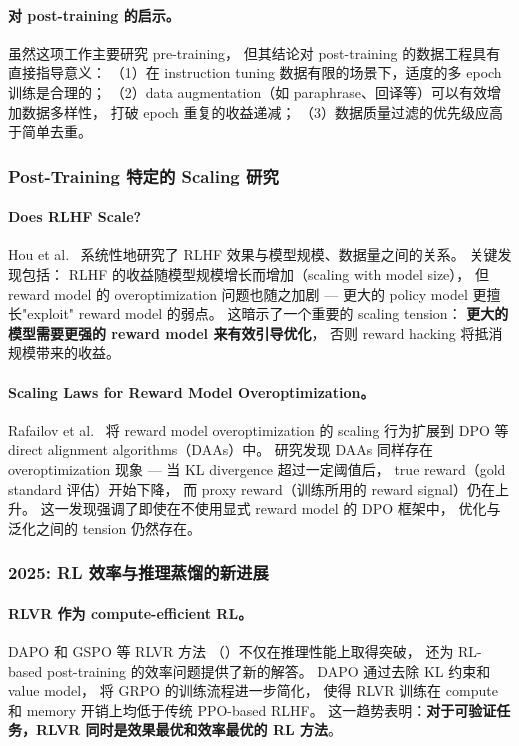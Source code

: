\paragraph{对 post-training 的启示。}
虽然这项工作主要研究 pre-training，
但其结论对 post-training 的数据工程具有直接指导意义：
（1）在 instruction tuning 数据有限的场景下，适度的多 epoch 训练是合理的；
（2）data augmentation（如 paraphrase、回译等）可以有效增加数据多样性，
打破 epoch 重复的收益递减；
（3）数据质量过滤的优先级应高于简单去重。

\subsubsection{Post-Training 特定的 Scaling 研究}
\label{sec:t7-scaling-pt}

\paragraph{Does RLHF Scale?}
Hou et al.\ \cite{hou2024doesrlhfscale} 系统性地研究了
RLHF 效果与模型规模、数据量之间的关系。
关键发现包括：
RLHF 的收益随模型规模增长而增加（scaling with model size），
但 reward model 的 overoptimization 问题也随之加剧 ---
更大的 policy model 更擅长"exploit" reward model 的弱点。
这暗示了一个重要的 scaling tension：
\textbf{更大的模型需要更强的 reward model 来有效引导优化}，
否则 reward hacking 将抵消规模带来的收益。

\paragraph{Scaling Laws for Reward Model Overoptimization。}
Rafailov et al.\ \cite{rafailov2024scaling} 将 reward model overoptimization
的 scaling 行为扩展到 DPO 等 direct alignment algorithms（DAAs）中。
研究发现 DAAs 同样存在 overoptimization 现象 ---
当 KL divergence 超过一定阈值后，
true reward（gold standard 评估）开始下降，
而 proxy reward（训练所用的 reward signal）仍在上升。
这一发现强调了即使在不使用显式 reward model 的 DPO 框架中，
优化与泛化之间的 tension 仍然存在。

\subsubsection{2025: RL 效率与推理蒸馏的新进展}
\label{sec:t7-rl-distill-2025}

\paragraph{RLVR 作为 compute-efficient RL。}
DAPO \cite{yu2025dapo} 和 GSPO \cite{zheng2025gspo} 等 RLVR 方法
（）不仅在推理性能上取得突破，
还为 RL-based post-training 的效率问题提供了新的解答。
DAPO 通过去除 KL 约束和 value model，
将 GRPO 的训练流程进一步简化，
使得 RLVR 训练在 compute 和 memory 开销上均低于传统 PPO-based RLHF。
这一趋势表明：\textbf{对于可验证任务，RLVR 同时是效果最优和效率最优的 RL 方法}。

